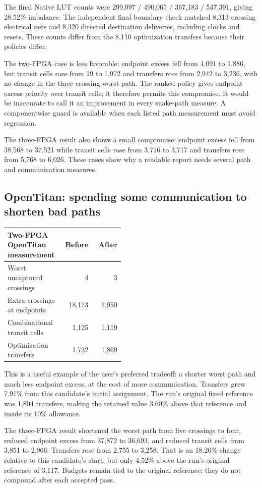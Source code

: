 \documentclass[11pt]{article}
\begin{document}
The final Native LUT counts were 299,097 / 490,065 / 367,183 / 547,391, giving 28.52\% imbalance. The independent final boundary check matched 8,313 crossing electrical nets and 8,320 directed destination deliveries, including clocks and resets. These counts differ from the 8,110 optimization transfers because their policies differ.

The two-FPGA case is less favorable: endpoint excess fell from 4,091 to 1,886, but transit cells rose from 19 to 1,972 and transfers rose from 2,942 to 3,236, with no change in the three-crossing worst path. The ranked policy gives endpoint excess priority over transit cells; it therefore permits this compromise. It would be inaccurate to call it an improvement in every snake-path measure. A componentwise guard is available when each listed path measurement must avoid regression.

The three-FPGA result also shows a small compromise: endpoint excess fell from 38,568 to 37,521 while transit cells rose from 3,716 to 3,717 and transfers rose from 5,768 to 6,026. These cases show why a readable report needs several path and communication measures.

\subsection{OpenTitan: spending some communication to shorten bad paths}

\begin{center}\small
\begin{tabular}{p{0.46\linewidth}rr}
\toprule
Two-FPGA OpenTitan measurement & Before & After\\
\midrule
Worst uncaptured crossings & 4 & 3\\
Extra crossings at endpoints & 18,173 & 7,950\\
Combinational transit cells & 1,125 & 1,119\\
Optimization transfers & 1,732 & 1,869\\
\bottomrule
\end{tabular}
\end{center}
This is a useful example of the user's preferred tradeoff: a shorter worst path and much less endpoint excess, at the cost of more communication. Transfers grew 7.91\% from this candidate's initial assignment. The run's original fixed reference was 1,804 transfers, making the retained value 3.60\% above that reference and inside its 10\% allowance.

The three-FPGA result shortened the worst path from five crossings to four, reduced endpoint excess from 37,872 to 36,693, and reduced transit cells from 3,851 to 2,966. Transfers rose from 2,755 to 3,258. That is an 18.26\% change relative to this candidate's start, but only 4.52\% above the run's original reference of 3,117. Budgets remain tied to the original reference; they do not compound after each accepted pass.
\end{document}
